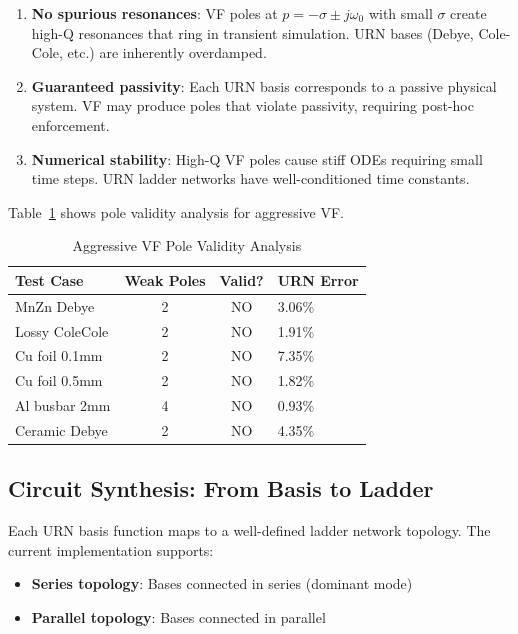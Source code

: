 \documentclass{ieeeaccess}
\begin{document}
\begin{enumerate}
\item \textbf{No spurious resonances}: VF poles at $p = -\sigma \pm j\omega_0$ with small $\sigma$ create high-Q resonances that ring in transient simulation. URN bases (Debye, Cole-Cole, etc.) are inherently overdamped.

\item \textbf{Guaranteed passivity}: Each URN basis corresponds to a passive physical system. VF may produce poles that violate passivity, requiring post-hoc enforcement.

\item \textbf{Numerical stability}: High-Q VF poles cause stiff ODEs requiring small time steps. URN ladder networks have well-conditioned time constants.
\end{enumerate}

Table~\ref{tab:pole_analysis} shows pole validity analysis for aggressive VF.

\begin{table}[!t]
\caption{Aggressive VF Pole Validity Analysis}
\label{tab:pole_analysis}
\centering
\begin{tabular}{@{}lccl@{}}
\toprule
\textbf{Test Case} & \textbf{Weak Poles} & \textbf{Valid?} & \textbf{URN Error} \\
\midrule
MnZn Debye & 2 & NO & 3.06\% \\
Lossy ColeCole & 2 & NO & 1.91\% \\
Cu foil 0.1mm & 2 & NO & 7.35\% \\
Cu foil 0.5mm & 2 & NO & 1.82\% \\
Al busbar 2mm & 4 & NO & 0.93\% \\
Ceramic Debye & 2 & NO & 4.35\% \\
\bottomrule
\end{tabular}
\end{table}

\subsection{Circuit Synthesis: From Basis to Ladder}

Each URN basis function maps to a well-defined ladder network topology. The current implementation supports:

\begin{itemize}
\item \textbf{Series topology}: Bases connected in series (dominant mode)
\item \textbf{Parallel topology}: Bases connected in parallel
\end{itemize}
\end{document}
